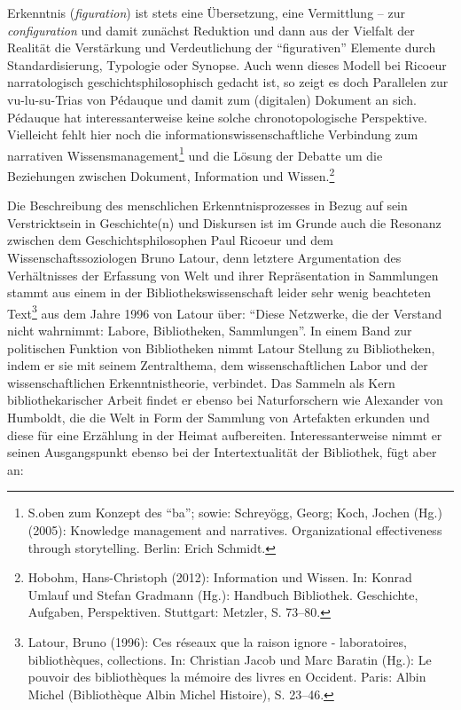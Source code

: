 Erkenntnis (\emph{figuration}) ist stets eine Übersetzung, eine
Vermittlung -- zur \emph{configuration} und damit zunächst Reduktion und
dann aus der Vielfalt der Realität die Verstärkung und Verdeutlichung
der \enquote{figurativen} Elemente durch Standardisierung, Typologie
oder Synopse. Auch wenn dieses Modell bei Ricoeur narratologisch
geschichtsphilosophisch gedacht ist, so zeigt es doch Parallelen zur
vu-lu-su-Trias von Pédauque und damit zum (digitalen) Dokument an sich.
Pédauque hat interessanterweise keine solche chronotopologische
Perspektive. Vielleicht fehlt hier noch die
informationswissenschaftliche Verbindung zum narrativen
Wissensmanagement\footnote{S.oben zum Konzept des \enquote{ba}; sowie:
  Schreyögg, Georg; Koch, Jochen (Hg.) (2005): Knowledge management and
  narratives. Organizational effectiveness through storytelling. Berlin:
  Erich Schmidt.} und die Lösung der Debatte um die Beziehungen zwischen
Dokument, Information und Wissen.\footnote{Hobohm, Hans-Christoph
  (2012): Information und Wissen. In: Konrad Umlauf und Stefan Gradmann
  (Hg.): Handbuch Bibliothek. Geschichte, Aufgaben, Perspektiven.
  Stuttgart: Metzler, S. 73--80.}

Die Beschreibung des menschlichen Erkenntnisprozesses in Bezug auf sein
Verstricktsein in Geschichte(n) und Diskursen ist im Grunde auch die
Resonanz zwischen dem Geschichtsphilosophen Paul Ricoeur und dem
Wissenschaftssoziologen Bruno Latour, denn letztere Argumentation des
Verhältnisses der Erfassung von Welt und ihrer Repräsentation in
Sammlungen stammt aus einem in der Bibliothekswissenschaft leider sehr
wenig beachteten Text\footnote{Latour, Bruno (1996): Ces réseaux que la
  raison ignore - laboratoires, bibliothèques, collections. In:
  Christian Jacob und Marc Baratin (Hg.): Le pouvoir des bibliothèques
  la mémoire des livres en Occident. Paris: Albin Michel (Bibliothèque
  Albin Michel Histoire), S. 23--46.} aus dem Jahre 1996 von Latour
über: \enquote{Diese Netzwerke, die der Verstand nicht wahrnimmt:
Labore, Bibliotheken, Sammlungen}. In einem Band zur politischen
Funktion von Bibliotheken nimmt Latour Stellung zu Bibliotheken, indem
er sie mit seinem Zentralthema, dem wissenschaftlichen Labor und der
wissenschaftlichen Erkenntnistheorie, verbindet. Das Sammeln als Kern
bibliothekarischer Arbeit findet er ebenso bei Naturforschern wie
Alexander von Humboldt, die die Welt in Form der Sammlung von Artefakten
erkunden und diese für eine Erzählung in der Heimat aufbereiten.
Interessanterweise nimmt er seinen Ausgangspunkt ebenso bei der
Intertextualität der Bibliothek, fügt aber an:

